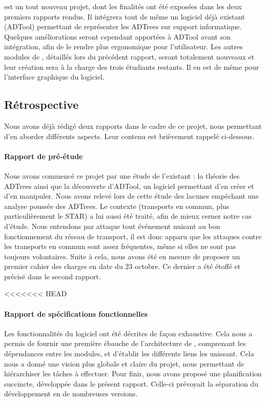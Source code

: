 	\glasir{} est un tout nouveau projet, dont les finalités ont été exposées dans les deux premiers rapports rendus. Il intégrera tout de même un logiciel déjà existant (ADTool) permettant de représenter les ADTrees sur support informatique. Quelques améliorations seront cependant apportées à ADTool avant son intégration, afin de le rendre plus ergonomique pour l'utilisateur. Les autres modules de \glasir{}, détaillés lors du précédent rapport, seront totalement nouveaux et leur création sera à la charge des trois étudiants restants. Il en est de même pour l'interface graphique du logiciel.

	\subsection{Rétrospective}

	Nous avons déjà rédigé deux rapports dans le cadre de ce projet, nous permettant d'en aborder différents aspects. Leur contenu est brièvement rappelé ci-dessous.

	\paragraph{Rapport de pré-étude} Nous avons commencé ce projet par une étude de l'existant : la théorie des ADTrees ainsi que la découverte d'ADTool, un logiciel permettant d'en créer et d'en manipuler. Nous avons relevé lors de cette étude des lacunes empêchant une analyse poussée des ADTrees. Le contexte (transports en commun, plus particulièrement le STAR) a lui aussi été traité, afin de mieux cerner notre cas d'étude. Nous entendons par \og attaque \fg{} tout événement nuisant au bon fonctionnement du réseau de transport, il est donc apparu que les attaques contre les transports en commun sont assez fréquentes, même si elles ne sont pas toujours volontaires. Suite à cela, nous avons été en mesure de proposer un premier cahier des charges en date du 23 octobre. Ce dernier a été étoffé et précisé dans le second rapport.

<<<<<<< HEAD
	\paragraph{Rapport de spécifications fonctionnelles} Les fonctionnalités du logiciel ont été décrites de façon exhaustive. Cela nous a permis de fournir une première ébauche de l'architecture de \glasir{}, comprenant les dépendances entre les modules, et d'établir les différents liens les unissant. Cela nous a donné une vision plus globale et claire du projet, nous permettant de hiérarchiser les tâches à effectuer. Pour finir, nous avons proposé une planification succincte, développée dans le présent rapport. Celle-ci prévoyait la séparation du développement en de nombreuses versions.

